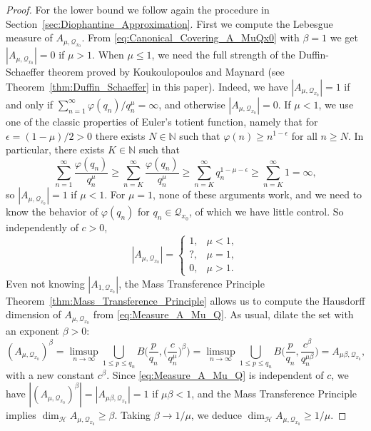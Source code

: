 \documentclass[11pt,reqno]{amsart}
\theoremstyle{definition}
\begin{document}
\begin{proof}
For the lower bound we follow again the procedure in Section~\ref{sec:Diophantine_Approximation}. 
First we compute the Lebesgue measure of $A_{\mu,\mathcal Q_{x_0}}$.
From \eqref{eq:Canonical_Covering_A_MuQx0} with $\beta = 1$ 
we get $|A_{\mu,\mathcal Q_{x_0}}| = 0$ if $\mu > 1$. 
When $\mu \leq 1$, we need the full strength of the Duffin-Schaeffer theorem proved by Koukoulopoulos and Maynard \cite{KoukoulopoulosMaynard2020} (see Theorem~\ref{thm:Duffin_Schaeffer} in this paper).
Indeed, we have $|A_{\mu,\mathcal Q_{x_0}}| = 1$ if and only if
$\sum_{n=1}^\infty \varphi(q_n)/q_n^\mu = \infty$, 
and otherwise $|A_{\mu,\mathcal Q_{x_0}}| = 0$.
If $\mu < 1$, we use one of the classic properties of Euler's totient function, 
namely that for $\epsilon = (1-\mu)/2 > 0$ there exists $N \in \mathbb N$
such that $\varphi(n) \geq n^{1-\epsilon}$ for all $n \geq N$. 
In particular, there exists $K \in \mathbb N$ such that 
\begin{equation}
\sum_{n=1}^\infty \frac{\varphi(q_n)}{q_n^\mu} 
\geq 
\sum_{n=K}^\infty \frac{\varphi(q_n)}{q_n^\mu} 
\geq 
\sum_{n=K}^\infty q_n^{1- \mu - \epsilon}
\geq 
\sum_{n=K}^\infty 1 
= \infty, 
\end{equation} 
so $|A_{\mu,\mathcal Q_{x_0}}| = 1$ if $\mu < 1$. 
For $\mu=1$, none of these arguments work, 
and we need to know the behavior of $\varphi(q_n)$ for $q_n \in \mathcal Q_{x_0}$, of which we have little control.
So independently of $c > 0$, 
\begin{equation}\label{eq:Measure_A_Mu_Q}
|A_{\mu,\mathcal Q_{x_0}}| = 
\left\{  \begin{array}{ll}
1, & \mu < 1, \\
?, & \mu = 1, \\
0, & \mu > 1. 
\end{array}
\right.
\end{equation}
Even not knowing $|A_{1,\mathcal Q_{x_0}}| $, 
the Mass Transference Principle Theorem~\ref{thm:Mass_Transference_Principle}
allows us to compute 
the Hausdorff dimension of $A_{\mu,\mathcal Q_{x_0}}$ 
from \eqref{eq:Measure_A_Mu_Q}. 
As usual,  
dilate the set with an exponent $\beta>0$:
\begin{equation}
(A_{\mu,\mathcal Q_{x_0}})^\beta 
= \limsup_{n \to \infty} \bigcup_{  1 \leq p \leq q_n } B \Big( \frac{p}{q_n}, \Big( \frac{c}{q_n^\mu} \Big)^\beta  \Big)
= \limsup_{n \to \infty} \bigcup_{1 \leq p \leq q_n } B \Big( \frac{p}{q_n}, \frac{c^\beta}{q_n^{\mu\beta}}  \Big)
= A_{\mu \beta,\mathcal Q_{x_0}}, 
\end{equation} 
with a new constant $c^\beta$.  
Since \eqref{eq:Measure_A_Mu_Q} is independent of $c$,  
we have $|(A_{\mu,\mathcal Q_{x_0}})^\beta| = |A_{\mu \beta,\mathcal Q_{x_0}}| = 1$
if $\mu \beta < 1$, 
and the Mass Transference Principle implies 
$\operatorname{dim}_{\mathcal H} A_{\mu,\mathcal Q_{x_0}} \geq \beta$. 
Taking $\beta \to 1/\mu$, we deduce   
$\operatorname{dim}_{\mathcal H} A_{\mu,\mathcal Q_{x_0}} \geq 1/\mu$. 
\end{proof}
\end{document}
